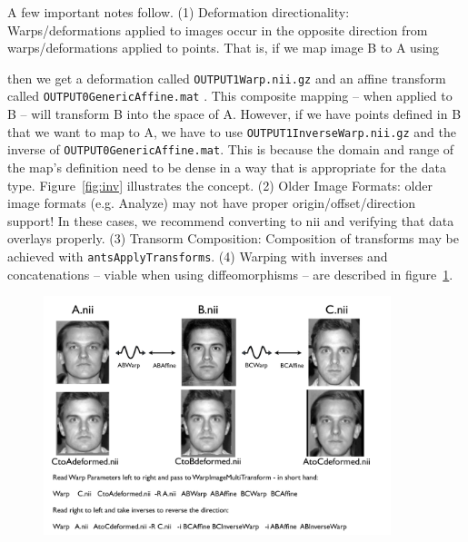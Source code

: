 \documentclass{InsightArticle}
\begin{document}
A few important notes follow. 
(1) Deformation directionality: Warps/deformations applied to images occur in the opposite direction from warps/deformations applied to points. That is, if we map image B to A using 

 then we get a deformation called \texttt{OUTPUT1Warp.nii.gz} and an affine transform called \texttt{OUTPUT0GenericAffine.mat} . 
This composite mapping -- when applied to B -- will transform B into the space of A. 
However, if we have points defined in B that we want to map to A, 
we have to use \texttt{OUTPUT1InverseWarp.nii.gz} and the inverse of \texttt{OUTPUT0GenericAffine.mat}.  
This is because the domain and range of the map's definition need to be dense in a way that is appropriate for the data type. 
Figure~\ref{fig:inv} illustrates the concept. 
(2) Older Image Formats: older image formats (e.g. Analyze) may not
have proper origin/offset/direction support! In these cases, we
recommend converting to nii and verifying that data overlays properly.
(3) Transorm Composition: Composition of transforms may be achieved with
\texttt{antsApplyTransforms}.  (4) Warping with inverses and concatenations --
viable when using diffeomorphisms -- are described in
figure~\ref{fig:warp}.
 \begin{figure}
\includegraphics[width=0.9\textwidth]{Figures/ANTSSyntax2.pdf} 
\vspace{-0.1in}
\label{fig:warp}
\end{figure}
\end{document}
